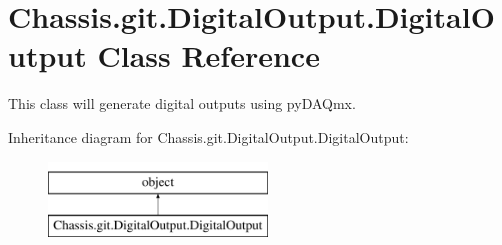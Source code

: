 \hypertarget{class_chassis_8git_1_1_digital_output_1_1_digital_output}{\section{Chassis.\-git.\-Digital\-Output.\-Digital\-Output Class Reference}
\label{class_chassis_8git_1_1_digital_output_1_1_digital_output}
}


This class will generate digital outputs using py\-D\-A\-Qmx.  


Inheritance diagram for Chassis.\-git.\-Digital\-Output.\-Digital\-Output\-:\begin{figure}[H]
\begin{center}
\leavevmode
\includegraphics[height=2.000000cm]{class_chassis_8git_1_1_digital_output_1_1_digital_output}
\end{center}
\end{figure}
